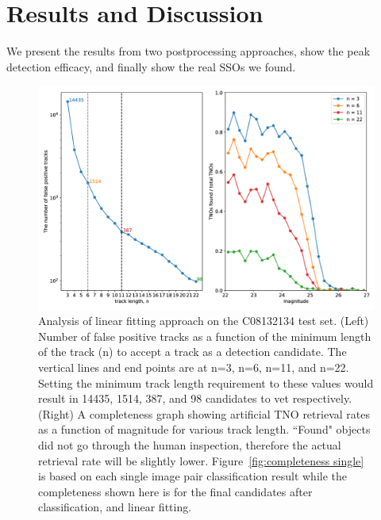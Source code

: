 
\section{Results and Discussion}
\label{sect: Results}

We present the results from two postprocessing approaches, show the peak detection efficacy, and finally show the real SSOs we found.

\begin{figure}
    \centering
    \includegraphics[width=\textwidth,keepaspectratio]{Figures/completeness_after_linear_fitting.png}
    \caption{Analysis of linear fitting approach on the C08132134 test set. (Left) Number of false positive tracks as a function of the minimum length of the track (n) to accept a track as a detection candidate.
    The vertical lines and end points are at n=3, n=6, n=11, and n=22.
    Setting the minimum track length requirement to these values would result in 14435, 1514, 387, and 98 candidates to vet respectively.
    (Right) A completeness graph showing artificial TNO retrieval rates as a function of magnitude for various track length.
    ``Found" objects did not go through the human inspection, therefore the actual retrieval rate will be slightly lower.
    Figure~\ref{fig:completeness single} is based on each single image pair classification result while the completeness shown here is for the final candidates after classification, and linear fitting.
    }
    \label{fig:completeness after Linear Fitting}
\end{figure}


